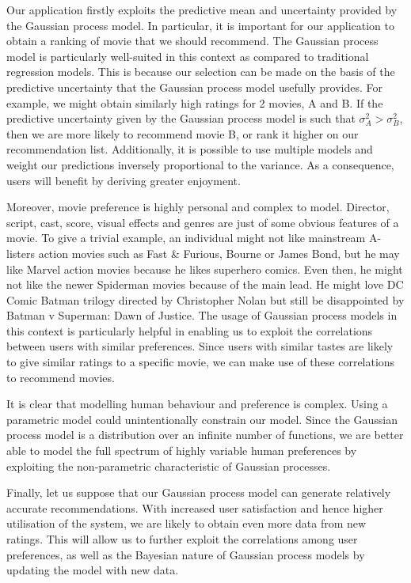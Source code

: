 \documentclass[letterpaper]{article}
\begin{document}
Our application firstly exploits the predictive mean and uncertainty provided by the Gaussian process model. In particular, it is important for our application to obtain a ranking of movie that we should recommend. The Gaussian process model is particularly well-suited in this context as compared to traditional regression models. This is because our selection can be made on the basis of the predictive uncertainty that the Gaussian process model usefully provides. For example, we might obtain similarly high ratings for 2 movies, A and B. If the predictive uncertainty given by the Gaussian process model is such that $\sigma_A^2 > \sigma_B^2$, then we are more likely to recommend movie B, or rank it higher on our recommendation list. Additionally, it is possible to use multiple models and weight our predictions inversely proportional to the variance. As a consequence, users will benefit by deriving greater enjoyment.

Moreover, movie preference is highly personal and complex to model. Director, script, cast, score, visual effects and genres are just of some obvious features of a movie. To give a trivial example, an individual might not like mainstream A-listers action movies such as Fast \& Furious, Bourne or James Bond, but he may like Marvel action movies because he likes superhero comics. Even then, he might not like the newer Spiderman movies because of the main lead. He might love DC Comic Batman trilogy directed by Christopher Nolan but still be disappointed by Batman v Superman: Dawn of Justice. The usage of Gaussian process models in this context is particularly helpful in enabling us to exploit the correlations between users with similar preferences. Since users with similar tastes are likely to give similar ratings to a specific movie, we can make use of these correlations to recommend movies.

It is clear that modelling human behaviour and preference is complex. Using a parametric model could unintentionally constrain our model. Since the Gaussian process model is a distribution over an infinite number of functions, we are better able to model the full spectrum of highly variable human preferences by exploiting the non-parametric characteristic of Gaussian processes.

Finally, let us suppose that our Gaussian process model can generate relatively accurate recommendations. With increased user satisfaction and hence higher utilisation of the system, we are likely to obtain even more data from new ratings. This will allow us to further exploit the correlations among user preferences, as well as the Bayesian nature of Gaussian process models by updating the model with new data.
\end{document}
